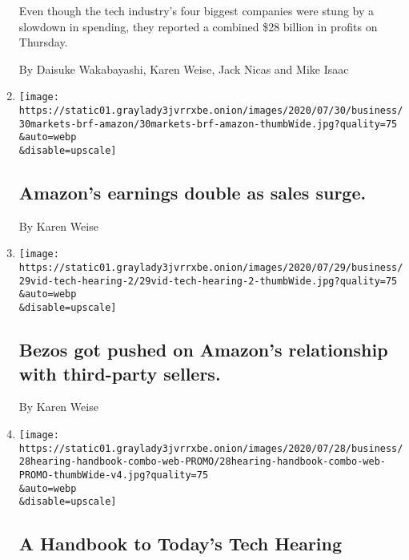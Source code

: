 \begin{enumerate}
  Even though the tech industry's four biggest companies were stung by a
  slowdown in spending, they reported a combined \$28 billion in profits
  on Thursday.

  By Daisuke Wakabayashi, Karen Weise, Jack Nicas and Mike Isaac
\item
  \href{/live/2020/07/30/business/stock-market-today-coronavirus/amazons-earnings-double-as-sales-surge}{}

  \texttt{[image: https://static01.graylady3jvrrxbe.onion/images/2020/07/30/business/30markets-brf-amazon/30markets-brf-amazon-thumbWide.jpg?quality=75\\\&auto=webp\\\&disable=upscale]}

  \hypertarget{amazons-earnings-double-as-sales-surge}{%
  \subsection{Amazon's earnings double as sales
  surge.}\label{amazons-earnings-double-as-sales-surge}}

  By Karen Weise
\item
  \href{/live/2020/07/29/technology/tech-ceos-hearing-testimony/bezos-got-pushed-on-amazons-relationship-with-third-party-sellers}{}

  \texttt{[image: https://static01.graylady3jvrrxbe.onion/images/2020/07/29/business/29vid-tech-hearing-2/29vid-tech-hearing-2-thumbWide.jpg?quality=75\\\&auto=webp\\\&disable=upscale]}

  \hypertarget{bezos-got-pushed-on-amazons-relationship-with-third-party-sellers}{%
  \subsection{Bezos got pushed on Amazon's relationship with third-party
  sellers.}\label{bezos-got-pushed-on-amazons-relationship-with-third-party-sellers}}

  By Karen Weise
\item
  \href{/2020/07/29/technology/tech-ceos-congress-what-to-know.html}{}

  \texttt{[image: https://static01.graylady3jvrrxbe.onion/images/2020/07/28/business/28hearing-handbook-combo-web-PROMO/28hearing-handbook-combo-web-PROMO-thumbWide-v4.jpg?quality=75\\\&auto=webp\\\&disable=upscale]}

  \hypertarget{a-handbook-to-todays-tech-hearing}{%
  \subsection{A Handbook to Today's Tech
  Hearing}\label{a-handbook-to-todays-tech-hearing}}


\end{enumerate}
